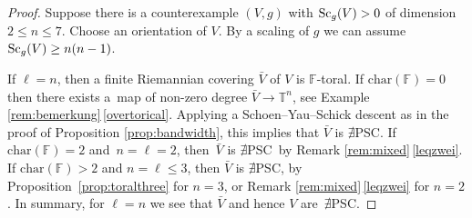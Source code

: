\documentclass[pdftex]{sigma}
\numberwithin{equation}{section}
\newcommand{\F}{\mathbb{F}}
\newcommand{\TTT}{\mathbb{T}}
\newcommand{\charac}{\mathrm{char}}
\newcommand{\Sc}{{\rm Sc}}
\newcommand{\no}{{\color{brown!70!black}$\nexists$}{\sf PSC}}
\begin{document}
\begin{proof} Suppose there is a counterexample $(V,g)$ with $\Sc_g(V) > 0$ of dimension $2 \leq n \leq 7$.
Choose an orientation of $V$.
By a scaling of $g$ we can assume $\Sc_g(V) \geq n(n-1)$.

If $\ell = n$, then a finite Riemannian covering $\bar V$ of $V$ is $\mathbb{F}$-toral.
If $\charac(\F) = 0$ then there exists a~map of non-zero degree $\bar V \to {\TTT}^n$, see Example \ref{rem:bemerkung}\,\ref{overtorical}.
Applying a Schoen--Yau--Schick descent as in the proof of Proposition \ref{prop:bandwidth}, this implies that $\bar V$ is \no.
If $\charac(\F) = 2$ and~${n = \ell = 2}$, then~$\bar V$ is \no~by Remark \ref{rem:mixed}\,\ref{leqzwei}.
If $\charac(\F) > 2$ and $n = \ell \leq 3$, then $\bar V$ is \no, by Proposition~\ref{prop:toralthree} for $n =3$, or Remark \ref{rem:mixed}\,\ref{leqzwei} for $n = 2$.
In summary, for $\ell = n$ we see that $\bar V$ and hence $V$ are~\no.


\end{proof}
\end{document}
